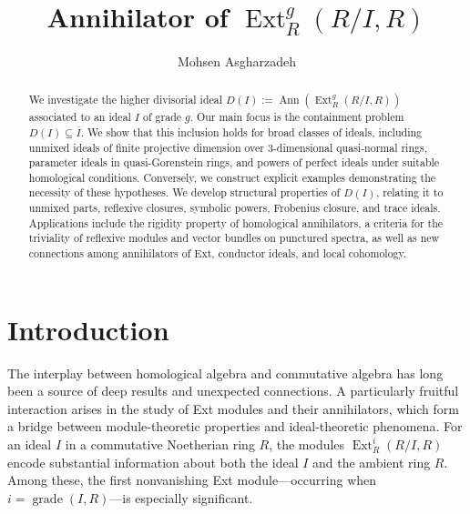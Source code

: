 \documentclass[11pt,a4paper]{amsart}
\numberwithin{equation}{section}
\DeclareMathOperator{\grade}{grade}
\DeclareMathOperator{\Ann}{Ann}\DeclareMathOperator{\ann}{Ann}
\DeclareMathOperator{\Ext}{Ext}
\begin{document}
\author[]{Mohsen Asgharzadeh}

\address{}


\title[Annihilator of $\Ext$ ]
{Annihilator of  $\Ext^g_R(R/I,R)$}




\begin{abstract}
	We investigate the higher divisorial ideal 
	\(
	D(I) := \Ann(\Ext^g_R(R/I,R))
	\)
	associated to an ideal \(I\) of grade \(g\). Our main focus is the containment problem \( D(I) \subseteq \overline{I} \). We show that this inclusion holds for broad classes of ideals, including unmixed ideals of finite projective dimension over $3$-dimensional quasi-normal rings, parameter ideals in quasi-Gorenstein rings, and powers of perfect ideals under suitable homological conditions. Conversely, we construct explicit examples demonstrating the necessity of these hypotheses. 
	We develop structural properties of \(D(I)\), relating it to unmixed parts, reflexive closures, symbolic powers, Frobenius closure, and trace ideals. Applications include the rigidity property of homological annihilators, a criteria for the triviality of reflexive modules and vector bundles on punctured spectra, as well as new connections among annihilators of Ext, conductor ideals, and local cohomology.
\end{abstract}

\maketitle
\tableofcontents

\section{Introduction}

The interplay between homological algebra and commutative algebra has long been a source of deep results and unexpected connections. A particularly fruitful interaction arises in the study of Ext modules and their annihilators, which form a bridge between module-theoretic properties and ideal-theoretic phenomena. For an ideal \(I\) in a commutative Noetherian ring \(R\), the modules \(\Ext^i_R(R/I,R)\) encode substantial information about both the ideal \(I\) and the ambient ring \(R\). Among these, the first nonvanishing Ext module—occurring when \(i = \grade(I,R)\)—is especially significant.
\end{document}
